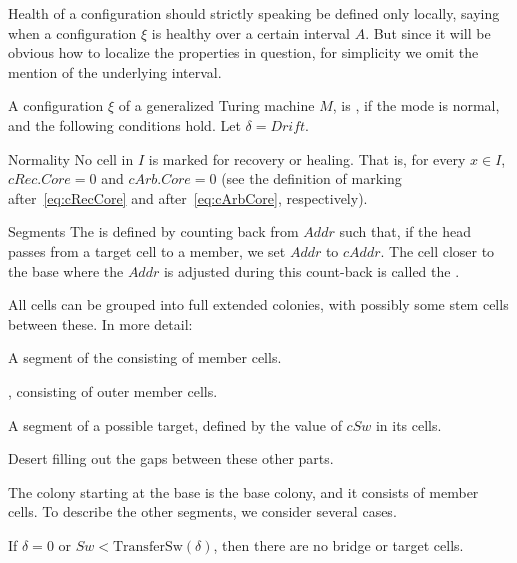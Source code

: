 \documentclass[12pt]{memoir}
\newcommand{\fld}[1]{\ensuremath{\textit{#1}}}
\newcommand{\Addr}{\fld{Addr}}
\newcommand{\cAddr}{\fld{cAddr}}
\newcommand{\cArb}{\fld{cArb}}
\newcommand{\Core}{\fld{Core}}
\newcommand{\Drift}{\fld{Drift}}
\newcommand{\cRec}{\fld{cRec}}
\newcommand{\Sweep}{\fld{Sw}}
\newcommand{\cSweep}{\fld{cSw}}
\newcommand{\TransferSw}{\mathrm{TransferSw}}
\begin{document}
\begin{definition}\label{def:healthy}
Health of a configuration should strictly speaking be defined only 
locally, saying when a configuration \( \xi \)
is healthy over a certain interval \( A \).
But since it will be obvious how to localize the properties in question,
for simplicity we omit the mention of the underlying interval.

    A configuration \( \xi \) of a generalized Turing machine \( M \),
    is , if the mode is normal, and the following conditions hold.
    Let \( \delta = \Drift \).

\begin{flushdescription}

     \item[Normality]
           No cell in \( I \) is marked for recovery or healing.
           That is, for every \( x \in I \), \( \cRec.\Core = 0 \) and
           \( \cArb.\Core = 0 \)
          (see the definition of marking after~\eqref{eq:cRecCore}
           and after~\eqref{eq:cArbCore}, respectively).

\item[Segments]
        The  is defined by counting back from \( \Addr \) such that, if the head
        passes from a target cell to a member, 
        we set \( \Addr \) to \( \cAddr \).
        The cell closer to the base where the \( \Addr \) is adjusted during
        this count-back is called the .

    All cells can be grouped into full extended colonies,
with possibly some stem cells between these.
In more detail:
  \begin{bullets}
  \item A segment of the  consisting of member cells.
  \item {}, consisting of outer member cells.
   \item A segment of a possible target, defined by the value of \( \cSweep \) in its cells.
    \item Desert filling out the gaps between these other parts.
  \end{bullets}

        The colony starting at the base is the base colony, and it consists of member cells.
        To describe the other segments, we consider several cases.
        \begin{bullets}
        \item 
        If \( \delta=0 \) or \( \Sweep < \TransferSw(\delta) \), 
        then there are no bridge or target cells.


\end{bullets}
\end{flushdescription}
\end{definition}
\end{document}
